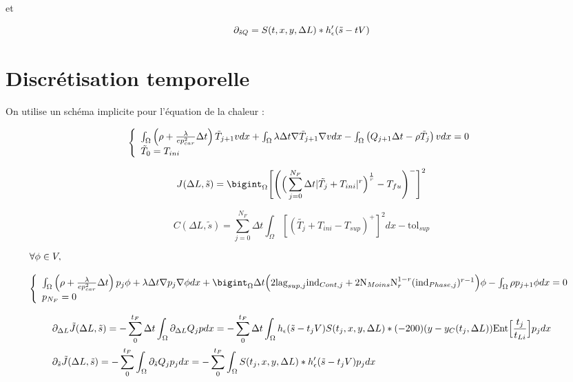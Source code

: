 \documentclass[11pt,a4paper]{article}
\begin{document}
et 

\begin{equation}
\partial_{\tilde{s} Q}=S(t,x,y,\Delta L)*h'_{\epsilon}(\tilde{s}-tV)
\end{equation}


\section*{Discrétisation temporelle}

On utilise un schéma implicite pour l'équation de la chaleur :

\begin{equation}
\left\{\begin{array}{l}
	\int_{\Omega} \left(\rho+\frac{\lambda}{ep^2_{car}}\Delta t\right)\tilde{T}_{j+1}vdx+\int_{\Omega} \lambda\Delta t \nabla\tilde{T}_{j+1}\nabla vdx-\int_{\Omega}\left(Q_{j+1}\Delta t-\rho\tilde{T}_j\right)vdx=0 \\
	\tilde{T}_0=T_{ini}
	\end{array}\right.
\end{equation}

\begin{equation}
J(\Delta L,\tilde{s})=\bigint_{\Omega}\Bigg[\Bigg(\Big(\sum_{j=0}^{N_F}\Delta t|\tilde{T_j}+T_{ini}|^r\Big)^{\frac{1}{r}}-T_{fu}\Bigg)^-\Bigg]^2 
\end{equation}


\begin{equation}
C(\Delta L,\tilde{s})=\sum_{j=0}^{N_F}\Delta t\int_{\Omega}[(\tilde{T_j}+T_{ini}-T_{sup})^+]^2dx-\textrm{tol}_{sup}
\end{equation}

\begin{equation}
\begin{array}{l}
\forall \phi\in V, \\
\\
\accUnecol{
	\intO\left(\rho+\frac{\lambda}{ep_{car}^2}\Delta t\right)p_j\phi+\lambda\Delta t\nabla p_j \nabla \phi dx +\bigintO\Delta t\Big(2\textrm{lag}_{sup,j}\textrm{ind}_{Cont,j}+2\textrm{N}_{Moins}\textrm{N}_r^{1-r}(\textrm{ind}_{Phase,j})^{r-1}\Big)\phi-\intO\rho p_{j+1}\phi dx=0 \\
	p_{N_F}=0
}
\end{array}
\end{equation}


\begin{equation}
\begin{aligned}
&\partial_{\Delta L}\tilde{J}(\Delta L, \tilde s)=-\sum_{0}^{t_F}\Delta t\int_{\Omega} \partial_{\Delta L} Q_j p dx=-\sum_{0}^{t_F}\Delta t\int_{\Omega}h_{\epsilon}(\tilde{s}-t_jV)S(t_j,x,y,\Delta L)*(-200)(y-y_C(t_j,\Delta L))\textrm{Ent}\Big[\frac{t_j}{t_{Li}}\Big]p_j dx \\
&\partial_{\tilde s}\tilde{J}(\Delta L, \tilde s)=-\sum_{0}^{t_F}\int_{\Omega} \partial_{\tilde s} Q_j p_j dx =-\sum_{0}^{t_F}\int_{\Omega} S(t_j,x,y,\Delta L)*h'_{\epsilon}(\tilde{s}-t_jV)p_j dx
\end{aligned}
\end{equation}
\end{document}
